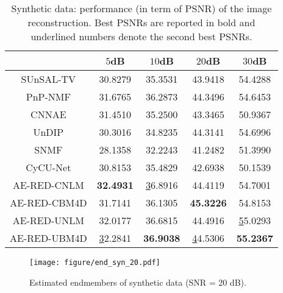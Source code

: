 \documentclass[journal,a4paper]{IEEEtran}
\begin{document}
\begin{table}[h]
\centering
\renewcommand\arraystretch{1.5}
\caption{Synthetic data: performance (in term of PSNR) of the image reconstruction. Best PSNRs are reported in bold and underlined numbers denote the second best PSNRs.}\label{Tab_syn_PSNR_results}
\begin{tabular}{c|c|c|c|c}
\hline\hline
            & $5$dB             & $10$dB            & $20$dB            & $30$dB            \\ \hline
SUnSAL-TV   & 30.8279          & 35.3531          & 43.9418          & 54.4288          \\ \hline
PnP-NMF     & 31.6765          & 36.2873          & 44.3496          & 54.6453          \\ \hline
CNNAE       & 31.4510          & 35.2500          & 43.3465          & 50.9367          \\ \hline
UnDIP       & 30.3016          & 34.8235          & 44.3141          & 54.6996          \\ \hline
SNMF        & 28.1358          & 32.2243          & 41.2482          & 51.3990          \\ \hline
CyCU-Net    & 30.8153          & 35.4829          & 42.6938          & 50.1539          \\ \hline
AE-RED-CNLM  & \textbf{32.4931} & {\ul 36.8916}    & 44.4119          & 54.7001          \\ \hline
AE-RED-CBM4D & 31.7141          & 36.1305          & \textbf{45.3226} & 54.8153          \\ \hline
AE-RED-UNLM  & 32.0177          & 36.6815          & 44.4916          & {\ul 55.0293}    \\ \hline
AE-RED-UBM4D & {\ul 32.2841}    & \textbf{36.9038} & {\ul 44.5306}    & \textbf{55.2367} \\ \hline\hline
\end{tabular}
\end{table}
\begin{figure}[h]
  \centering
  \texttt{[image: figure/end\_syn\_20.pdf]}\\
  \caption{Estimated endmembers of synthetic data (SNR = 20 dB).}\label{fig.end_syn}
\end{figure}
\end{document}
